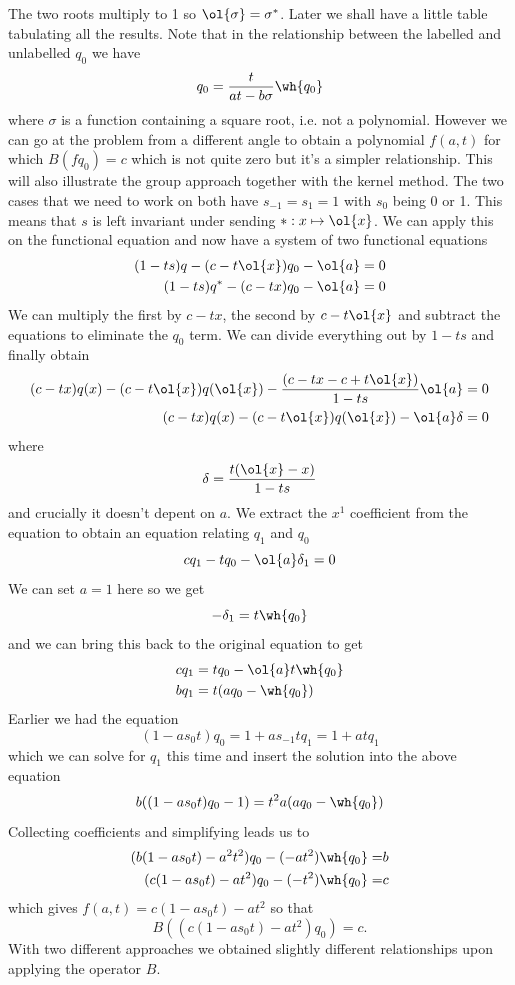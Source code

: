 The two roots multiply to 1 so $\ol{\sigma} = \sigma^\ast$. Later we shall have a little table tabulating all the results.
Note that in the relationship between the labelled and unlabelled $q_0$ we have
\[
	q_0 = \frac{t}{at-b\sigma}\wh{q_0}
\]
where $\sigma$ is a function containing a square root, i.e. not a polynomial. However we can go at the problem from a different angle to obtain a polynomial $f(a,t)$ for which $B(fq_0) = c$ which is not quite zero but it's a simpler relationship. This will also illustrate the group approach together with the kernel method. The two cases that we need to work on both have $s_{-1} = s_1 = 1$ with $s_0$ being 0 or 1. This means that $s$ is left invariant under sending $\ast: x \mapsto \ol{x}$. We can apply this on the functional equation and now have a system of two functional equations
\begin{align*}
	(1-ts)q - (c -t\ol{x})q_0 - \ol{a}=0\\
	(1-ts)q^\ast - (c -tx)q_0 -\ol{a}=0
\end{align*}
We can multiply the first by $c -tx$, the second by $c -t\ol{x}$ and subtract the equations to eliminate the $q_0$ term. We can divide everything out by $1-ts$ and finally obtain
\begin{align*}
	(c-tx)q(x) - (c-t\ol{x})q(\ol{x}) -\frac{(c-tx-c+t\ol{x})}{1-ts}\ol{a} &= 0\\
	(c-tx)q(x) - (c-t\ol{x})q(\ol{x}) -\ol{a}\delta &= 0
\end{align*}
where
\[
	\delta =\frac{t(\ol{x}-x)}{1-ts}
\]
and crucially it doesn't depent on $a$. We extract the $x^1$ coefficient from the equation to obtain an equation relating $q_1$ and $q_0$
\[
	c q_1 - t q_0 - \ol{a}\delta_1 = 0
\]
We can set $a = 1$ here so we get
\[
	-\delta_1 = t \wh{q_0}
\]
and we can bring this back to the original equation to get
\begin{align*}
	c q_1 &= t q_0 - \ol{a} t \wh{q_0}\\
	b q_1 &= t (aq_0 - \wh{q_0})
\end{align*}
Earlier we had the equation
\[
	(1-as_0t)q_0 = 1 + a s_{-1} t q_1 = 1 + at q_1
\]
which we can solve for $q_1$ this time and insert the solution into the above equation
\[
	b ((1-as_0t)q_0-1) = t^2 a (aq_0 - \wh{q_0})
\]
Collecting coefficients and simplifying leads us to
\begin{align*}
	(b(1-as_0t)-a^2 t^2) q_0 -(-at^2)\wh{q_0} =& b\\
	(c(1-as_0t)-a t^2) q_0 -(-t^2)\wh{q_0} =& c
\end{align*}
which gives $f(a,t) = c(1-as_0t)-a t^2$ so that
\[
	B((c(1-as_0t)-a t^2)q_0) = c.
\]
With two different approaches we obtained slightly different relationships upon applying the operator $B$.
